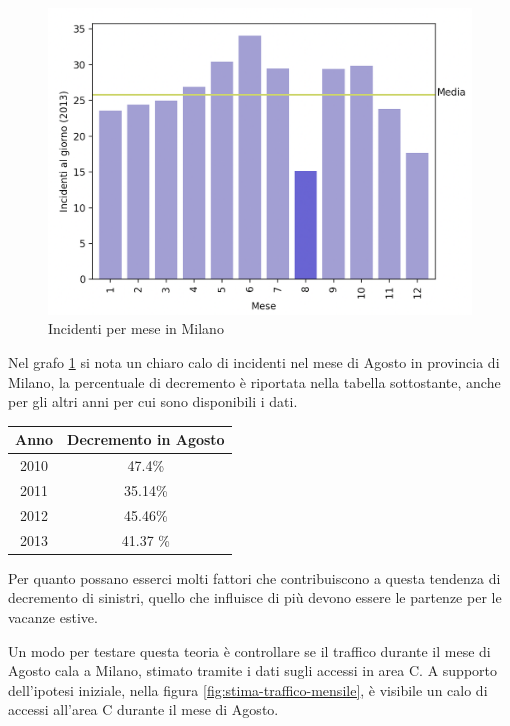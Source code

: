 \documentclass[a4paper]{report}
\begin{document}
\begin{figure}
    \includegraphics[width=\linewidth]{../src/incidenti/incidenti_senza_coords/mese_incidenti/milano_mese.png}
    \caption{Incidenti per mese in Milano}
    \label{fig:milano-mese}
\end{figure}

Nel grafo \ref{fig:milano-mese} si nota un chiaro calo di incidenti nel mese di 
Agosto in provincia di Milano, la percentuale di decremento è riportata nella tabella sottostante, 
anche per gli altri anni per cui sono disponibili i dati.


\begin{center}
    \def\arraystretch{1.5}%
    \begin{tabular}{ |c|c| } 
        \hline
        Anno & Decremento in Agosto \\ 
        \hline
        2010 & 47.4\%  \\ 
        \rowcolor{TableGray}
        2011 & 35.14\% \\
        2012 & 45.46\% \\
        \rowcolor{TableGray}
        2013 & 41.37 \% \\
        \hline
    \end{tabular}
\end{center}

Per quanto possano esserci molti fattori che contribuiscono a questa tendenza di decremento di sinistri, 
quello che influisce di più devono essere le partenze per le vacanze estive.

Un modo per testare questa teoria è controllare se il traffico durante il mese di Agosto cala a 
Milano, stimato tramite i dati sugli accessi in area C. 
A supporto dell'ipotesi iniziale, nella figura \ref{fig:stima-traffico-mensile}, 
è visibile un calo di accessi all'area C durante il mese di Agosto.
\end{document}
